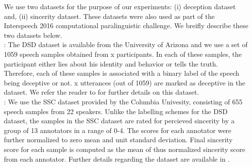 \documentclass{article}
\begin{document}

We use two datasets for the purpose of our experiments: (i) deception dataset and, (ii) sincerity dataset.
These datasets were also used as part of the Interspeech 2016 computational paralinguistic challenge.
We breifly describe these two datasets below.\\ 

:
The DSD dataset is available from the University of Arizona and we use a set of 1059 speech samples obtained from x participants.
In each of these samples, the participant either lies about his identity and behavior or tells the truth. 
Therefore, each of these samples is associated with a binary label of the speech being deceptive or not.
x utterances (out of 1059) are marked as deceptive in the dataset.
We refer the reader to \cite{} for further details on this dataset.\\ 

:
We use the SSC dataset provided by the Columbia Univesity, consisting of 655 speech samples from 22 speakers.
Unlike the labelling schemes for the DSD dataset, the samples in the SSC dataset are rated for percieved sincerity by a group of 13 annotators in a range of 0-4. 
The scores for each annotator were further normalized to zero mean and unit standard deviation.
Final sincerity score for each sample is computed as the mean of thus normalized sincerity score from each annotator.
Further details regarding the dataset are available in \cite{}.
\end{document}
